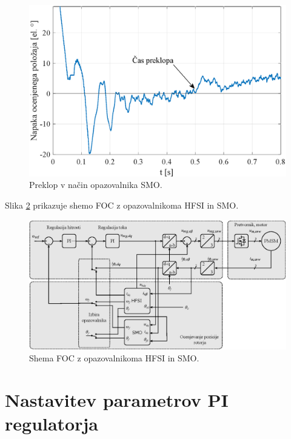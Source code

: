 \documentclass[a4paper,twoside,openright,12pt,slovene]{book}
\begin{document}
\begin{figure}[!htbp]
    \centering
    \includegraphics[width=0.99\columnwidth]{Slike/brezudarniPreklop_Err.eps}
    \caption{\label{brezudarniPreklop_Err} Preklop v način opazovalnika SMO. }
\end{figure}

\newpage
Slika \ref{FOC} prikazuje shemo FOC z opazovalnikoma HFSI in SMO. 

\begin{figure}[!htbp]
    \centering
    \includegraphics[width=0.95\columnwidth]{Slike/Inkscape/FOC.eps}
    \caption{\label{FOC} Shema FOC z opazovalnikoma HFSI in SMO.  }
\end{figure}

\newpage
\section{Nastavitev parametrov PI regulatorja}
\end{document}
